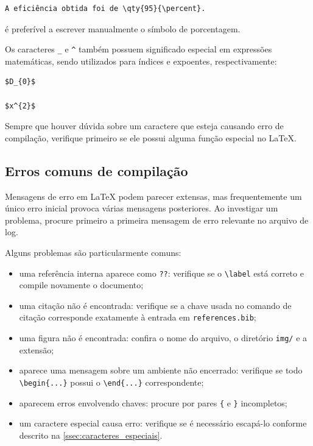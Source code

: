 \begin{verbatim}
A eficiência obtida foi de \qty{95}{\percent}.
\end{verbatim}

é preferível a escrever manualmente o símbolo de porcentagem.

Os caracteres \verb|_| e \verb|^| também possuem significado especial em expressões matemáticas, sendo utilizados para índices e expoentes, respectivamente:

\begin{verbatim}
$D_{0}$

$x^{2}$
\end{verbatim}

Sempre que houver dúvida sobre um caractere que esteja causando erro de compilação, verifique primeiro se ele possui alguma função especial no LaTeX.

\subsection{Erros comuns de compilação}
\label{ssec:erros_comuns}

Mensagens de erro em LaTeX podem parecer extensas, mas frequentemente um único erro inicial provoca várias mensagens posteriores. Ao investigar um problema, procure primeiro a primeira mensagem de erro relevante no arquivo de log.

Alguns problemas são particularmente comuns:

\begin{itemize}
\item uma referência interna aparece como \verb|??|: verifique se o
\verb|\label| está correto e compile novamente o documento;
\item uma citação não é encontrada: verifique se a chave usada no
comando de citação corresponde exatamente à entrada em
\verb|references.bib|;
\item uma figura não é encontrada: confira o nome do arquivo, o
diretório \verb|img/| e a extensão;
\item aparece uma mensagem sobre um ambiente não encerrado:
verifique se todo \verb|\begin{...}| possui o
\verb|\end{...}| correspondente;
\item aparecem erros envolvendo chaves: procure por pares
\verb|{| e \verb|}| incompletos;
\item um caractere especial causa erro: verifique se é necessário
escapá-lo conforme descrito na \cref{ssec:caracteres_especiais}.
\end{itemize}

